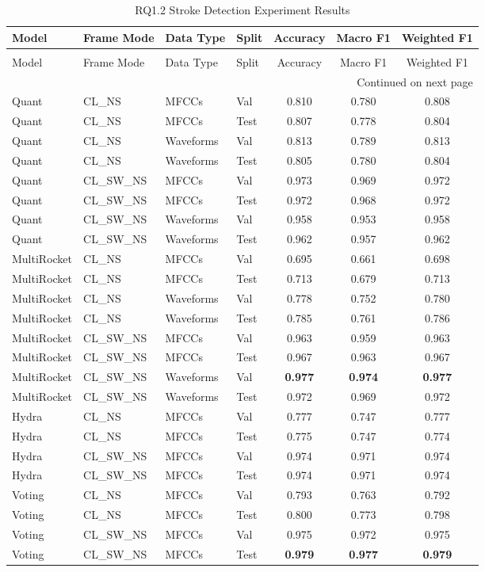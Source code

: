 \begin{longtable}{|l|l|l|l|c|c|c|}
\caption{RQ1.2 Stroke Detection Experiment Results} \label{tab:rq1.2_Stroke_Detection_Results} \\
\toprule
Model & Frame Mode & Data Type & Split & Accuracy & Macro F1 & Weighted F1 \\
\midrule
\endfirsthead
\caption[]{RQ1.2 Stroke Detection Experiment Results} \\
\toprule
Model & Frame Mode & Data Type & Split & Accuracy & Macro F1 & Weighted F1 \\
\midrule
\endhead
\midrule
\multicolumn{7}{r}{Continued on next page} \\
\midrule
\endfoot
\bottomrule
\endlastfoot
Quant & CL\_NS & MFCCs & Val & 0.810 & 0.780 & 0.808 \\
Quant & CL\_NS & MFCCs & Test & 0.807 & 0.778 & 0.804 \\
Quant & CL\_NS & Waveforms & Val & 0.813 & 0.789 & 0.813 \\
Quant & CL\_NS & Waveforms & Test & 0.805 & 0.780 & 0.804 \\
Quant & CL\_SW\_NS & MFCCs & Val & 0.973 & 0.969 & 0.972 \\
Quant & CL\_SW\_NS & MFCCs & Test & 0.972 & 0.968 & 0.972 \\
Quant & CL\_SW\_NS & Waveforms & Val & 0.958 & 0.953 & 0.958 \\
Quant & CL\_SW\_NS & Waveforms & Test & 0.962 & 0.957 & 0.962 \\
MultiRocket & CL\_NS & MFCCs & Val & 0.695 & 0.661 & 0.698 \\
MultiRocket & CL\_NS & MFCCs & Test & 0.713 & 0.679 & 0.713 \\
MultiRocket & CL\_NS & Waveforms & Val & 0.778 & 0.752 & 0.780 \\
MultiRocket & CL\_NS & Waveforms & Test & 0.785 & 0.761 & 0.786 \\
MultiRocket & CL\_SW\_NS & MFCCs & Val & 0.963 & 0.959 & 0.963 \\
MultiRocket & CL\_SW\_NS & MFCCs & Test & 0.967 & 0.963 & 0.967 \\
MultiRocket & CL\_SW\_NS & Waveforms & Val & \textbf{0.977} & \textbf{0.974} & \textbf{0.977} \\
MultiRocket & CL\_SW\_NS & Waveforms & Test & 0.972 & 0.969 & 0.972 \\
Hydra & CL\_NS & MFCCs & Val & 0.777 & 0.747 & 0.777 \\
Hydra & CL\_NS & MFCCs & Test & 0.775 & 0.747 & 0.774 \\
Hydra & CL\_SW\_NS & MFCCs & Val & 0.974 & 0.971 & 0.974 \\
Hydra & CL\_SW\_NS & MFCCs & Test & 0.974 & 0.971 & 0.974 \\
Voting & CL\_NS & MFCCs & Val & 0.793 & 0.763 & 0.792 \\
Voting & CL\_NS & MFCCs & Test & 0.800 & 0.773 & 0.798 \\
Voting & CL\_SW\_NS & MFCCs & Val & 0.975 & 0.972 & 0.975 \\
Voting & CL\_SW\_NS & MFCCs & Test & \textbf{0.979} & \textbf{0.977} & \textbf{0.979} \\
\end{longtable}

